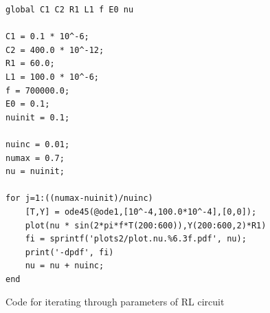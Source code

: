 \documentclass[12pt]{report}
\begin{document}
\begin{figure}[h]
\begin{lstlisting}
global C1 C2 R1 L1 f E0 nu

C1 = 0.1 * 10^-6;
C2 = 400.0 * 10^-12;
R1 = 60.0;
L1 = 100.0 * 10^-6;
f = 700000.0;
E0 = 0.1;
nuinit = 0.1;

nuinc = 0.01;
numax = 0.7;
nu = nuinit;

for j=1:((numax-nuinit)/nuinc)
    [T,Y] = ode45(@ode1,[10^-4,100.0*10^-4],[0,0]);
    plot(nu * sin(2*pi*f*T(200:600)),Y(200:600,2)*R1)
    fi = sprintf('plots2/plot.nu.%6.3f.pdf', nu);
    print('-dpdf', fi)
    nu = nu + nuinc;
end
\end{lstlisting}
	\caption{Code for iterating through parameters of RL circuit}
	\label{code:run}
\end{figure}



\end{document}
